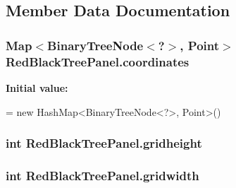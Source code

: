 \subsection{Member Data Documentation}
\subsubsection[{\texorpdfstring{coordinates}{coordinates}}]{\setlength{\rightskip}{0pt plus 5cm}Map$<${\bf Binary\+Tree\+Node}$<$?$>$, Point$>$ Red\+Black\+Tree\+Panel.\+coordinates\hspace{0.3cm}{\ttfamily [private]}}\hypertarget{class_red_black_tree_panel_a195d2ca0e54a0e3ef7a4c8b92ad131c4}{}\label{class_red_black_tree_panel_a195d2ca0e54a0e3ef7a4c8b92ad131c4}
{\bfseries Initial value\+:}
\begin{DoxyCode}
=
        \textcolor{keyword}{new} HashMap<BinaryTreeNode<?>, Point>()
\end{DoxyCode}
\subsubsection[{\texorpdfstring{gridheight}{gridheight}}]{\setlength{\rightskip}{0pt plus 5cm}int Red\+Black\+Tree\+Panel.\+gridheight\hspace{0.3cm}{\ttfamily [private]}}\hypertarget{class_red_black_tree_panel_a3b5cac95680f28f3248d30987b6b682c}{}\label{class_red_black_tree_panel_a3b5cac95680f28f3248d30987b6b682c}
\subsubsection[{\texorpdfstring{gridwidth}{gridwidth}}]{\setlength{\rightskip}{0pt plus 5cm}int Red\+Black\+Tree\+Panel.\+gridwidth\hspace{0.3cm}{\ttfamily [private]}}\hypertarget{class_red_black_tree_panel_abfb80e580d5940d6f3c56032cca0a16d}{}\label{class_red_black_tree_panel_abfb80e580d5940d6f3c56032cca0a16d}
